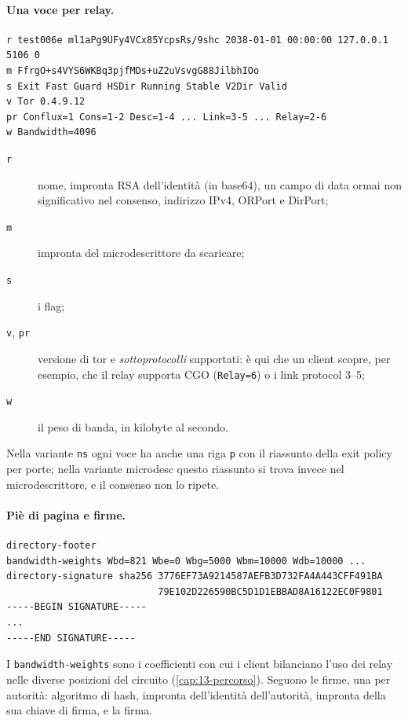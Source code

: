 \paragraph{Una voce per relay.}
\begin{lstlisting}[numbers=none]
r test006e ml1aPg9UFy4VCx85YcpsRs/9shc 2038-01-01 00:00:00 127.0.0.1 5106 0
m FfrgO+s4VYS6WKBq3pjfMDs+uZ2uVsvgG88JilbhIOo
s Exit Fast Guard HSDir Running Stable V2Dir Valid
v Tor 0.4.9.12
pr Conflux=1 Cons=1-2 Desc=1-4 ... Link=3-5 ... Relay=2-6
w Bandwidth=4096
\end{lstlisting}
\begin{description}
  \item[\texttt{r}] nome, impronta RSA dell'identità (in base64), un campo di data ormai non significativo nel consenso, indirizzo IPv4, ORPort e DirPort;
  \item[\texttt{m}] impronta del microdescrittore da scaricare;
  \item[\texttt{s}] i flag;
  \item[\texttt{v}, \texttt{pr}] versione di tor e \emph{sottoprotocolli} supportati: è qui che un client scopre, per esempio, che il relay supporta CGO (\texttt{Relay=6}) o i link protocol 3--5;
  \item[\texttt{w}] il peso di banda, in kilobyte al secondo.
\end{description}
Nella variante \texttt{ns} ogni voce ha anche una riga \texttt{p} con il riassunto della exit policy per porte; nella variante microdesc questo riassunto si trova invece nel microdescrittore, e il consenso non lo ripete.

\paragraph{Piè di pagina e firme.}
\begin{lstlisting}[numbers=none]
directory-footer
bandwidth-weights Wbd=821 Wbe=0 Wbg=5000 Wbm=10000 Wdb=10000 ...
directory-signature sha256 3776EF73A9214587AEFB3D732FA4A443CFF491BA
                           79E102D226590BC5D1D1EBBAD8A16122EC0F9801
-----BEGIN SIGNATURE-----
...
-----END SIGNATURE-----
\end{lstlisting}
I \texttt{bandwidth-weights} sono i coefficienti con cui i client bilanciano l'uso dei relay nelle diverse posizioni del circuito (\cref{cap:13-percorso}). Seguono le firme, una per autorità: algoritmo di hash, impronta dell'identità dell'autorità, impronta della sua chiave di firma, e la firma.

